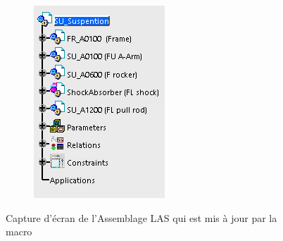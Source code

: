 \begin{figure}
\begin{subfigure}{.25\textwidth}
        \includegraphics[width=\textwidth]{img/susp_tree.png}
    \end{subfigure}{}
    \caption{Capture d'écran de l'Assemblage LAS qui est mis à jour par la macro}
    \label{fig:assemblage_las}
\end{figure}
